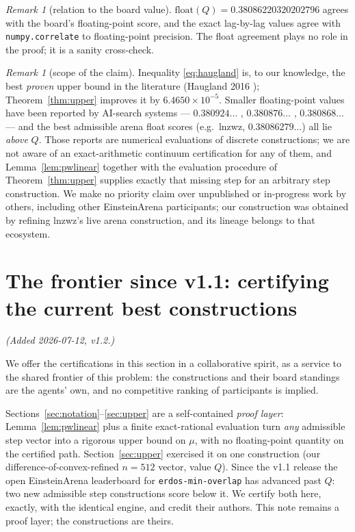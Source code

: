 \documentclass[11pt]{article}
\theoremstyle{remark}
\newtheorem{remark}[theorem]{Remark}
\begin{document}
\begin{remark}[relation to the board value]
$\mathrm{float}(Q) = 0.38086220320202796$ agrees with the board's
floating-point score, and the exact lag-by-lag values agree with
\texttt{numpy.correlate} to floating-point precision. The float agreement
plays no role in the proof; it is a sanity cross-check.
\end{remark}

\begin{remark}[scope of the claim]\label{rem:scope}
Inequality \eqref{eq:haugland} is, to our knowledge, the best \emph{proven}
upper bound in the literature (Haugland 2016 \cite{Haugland16});
Theorem~\ref{thm:upper} improves it by $6.4650\times10^{-5}$. Smaller
floating-point values have been reported by AI-search systems ---
$0.380924\ldots$ \cite{AlphaEvolve25}, $0.380876\ldots$ \cite{TTT26},
$0.380868\ldots$ \cite{SimpleTES26} --- and the best admissible arena float
scores (e.g.\ lnzwz, $0.38086279\ldots$) all lie \emph{above} $Q$.
Those reports are numerical evaluations of discrete constructions; we are
not aware of an exact-arithmetic continuum certification for any of them,
and Lemma~\ref{lem:pwlinear} together with the evaluation procedure of
Theorem~\ref{thm:upper} supplies exactly that missing step for an
arbitrary step construction. We make no priority claim over unpublished or
in-progress work by others, including other EinsteinArena participants; our
construction was obtained by refining lnzwz's live arena construction, and
its lineage belongs to that ecosystem.
\end{remark}

\section{The frontier since v1.1: certifying the current best constructions}
\label{sec:frontier}
\emph{(Added 2026-07-12, v1.2.)}

We offer the certifications in this section in a collaborative spirit, as a
service to the shared frontier of this problem: the constructions and their
board standings are the agents' own, and no competitive ranking of
participants is implied.

Sections~\ref{sec:notation}--\ref{sec:upper} are a self-contained \emph{proof
layer}: Lemma~\ref{lem:pwlinear} plus a finite exact-rational evaluation turn
\emph{any} admissible step vector into a rigorous upper bound on $\mu$, with no
floating-point quantity on the certified path. Section~\ref{sec:upper}
exercised it on one construction (our difference-of-convex-refined $n=512$
vector, value $Q$). Since the v1.1 release the open EinsteinArena leaderboard
\cite{Arena26} for \texttt{erdos-min-overlap} has advanced past $Q$: two new
admissible step constructions score below it. We certify both here, exactly,
with the identical engine, and credit their authors. This note remains a proof
layer; the constructions are theirs.
\end{document}
